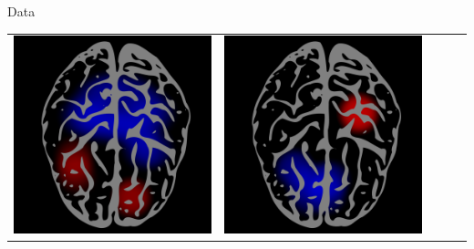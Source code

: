 \documentclass[final]{beamer}
\newlength{\onecolwid}
\begin{document}
\begin{frame}[t]
\begin{columns}[t]
\begin{column}{\onecolwid}
\begin{block}{Data}
\begin{center}
\begin{tabular}{ccccc}
\includegraphics[scale = 0.10]{brain1.png} &
\includegraphics[scale = 0.10]{brain2.png} &

\end{tabular}
\end{center}
\end{block}
\end{column}
\end{columns}
\end{frame}
\end{document}
